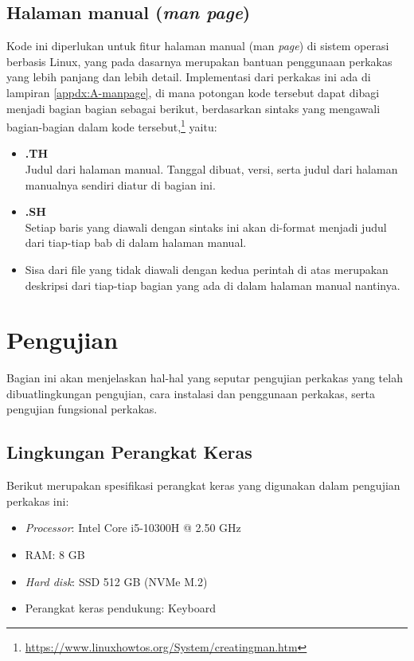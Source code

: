 \subsection{Halaman manual (\textit{man page})}
\label{sec:testing-implementation-man}

Kode ini diperlukan untuk fitur halaman manual (man \textit{page}) di sistem operasi berbasis Linux, yang pada dasarnya merupakan bantuan penggunaan perkakas yang lebih panjang dan lebih detail. Implementasi dari perkakas ini ada di lampiran \ref{appdx:A-manpage}, di mana potongan kode tersebut dapat dibagi menjadi bagian bagian sebagai berikut, berdasarkan sintaks yang mengawali bagian-bagian dalam kode tersebut,\footnote{\href{https://www.linuxhowtos.org/System/creatingman.htm}{https://www.linuxhowtos.org/System/creatingman.htm}} yaitu:

\begin{itemize}
	\item \textbf{.TH} \\
	Judul dari halaman manual. Tanggal dibuat, versi, serta judul dari halaman manualnya sendiri diatur di bagian ini.
	\item \textbf{.SH} \\
	Setiap baris yang diawali dengan sintaks ini akan di-format menjadi judul dari tiap-tiap bab di dalam halaman manual.
	\item Sisa dari file yang tidak diawali dengan kedua perintah di atas merupakan deskripsi dari tiap-tiap bagian yang ada di dalam halaman manual nantinya.
\end{itemize}

\section{Pengujian}
\label{sec:testing-experiments}

Bagian ini akan menjelaskan hal-hal yang seputar pengujian perkakas yang telah dibuat\textemdash lingkungan pengujian, cara instalasi dan penggunaan perkakas, serta pengujian fungsional perkakas.

\subsection{Lingkungan Perangkat Keras}
\label{sec:testing-experiments-hardware}

Berikut merupakan spesifikasi perangkat keras yang digunakan dalam pengujian perkakas ini:

\begin{itemize}
	\item \textit{Processor}: Intel\logoregistered\xspace Core\logotrademark\xspace i5-10300H @ 2.50 GHz
	\item RAM: 8 GB
	\item \textit{Hard disk}: SSD 512 GB (NVMe\logotrademark\xspace M.2)
	\item Perangkat keras pendukung: Keyboard
\end{itemize}

